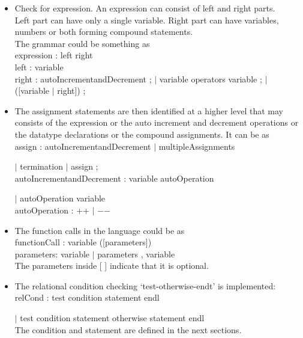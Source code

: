 \documentclass[12pt, oneside, a4paper]{article}
\begin{document}
\begin{itemize}
\item Check for expression.  An expression can consist of left and right parts.\\
Left part can have only a single variable.  Right part can have variables, numbers or both forming compound statements.\\
The grammar could be something as\\

expression : left right\\
left : variable\\
right : autoIncrementandDecrement ;
\hspace{.75in}$|$ variable operators variable ;
\hspace{.75in}$|$ ([variable $|$ right]) ;\\

\item The assignment statements are then identified at a higher level that may consists of the expression or the auto increment and decrement operations or the datatype declarations or the compound assignments.  It can be as\\
assign : autoIncrementandDecrement $|$ multipleAssignments

\hspace{.5in}$|$ termination $|$ assign ;\\
autoIncrementandDecrement : variable autoOperation

\hspace{2in} $|$ autoOperation variable\\
autoOperation : ++ $|$ $-$$-$\\
\item The function calls in the language could be as\\
functionCall : variable ([parameters])\\
parameters: variable $|$ parameters , variable\\
The parameters inside [ ] indicate that it is optional.\\
\item The relational condition checking `test-otherwise-endt' is implemented:\\
relCond : test condition statement endl

\hspace{.5in} $|$ test condition statement otherwise statement endl\\

The condition and statement are defined in the next sections.\\


\end{itemize}
\end{document}
